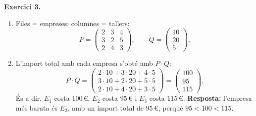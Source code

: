 \documentclass[12pt,a4paper]{article}
\newcommand{\blocInici}{%
  \par\nobreak\vspace{0pt}%
  \begin{minipage}[t]{\linewidth}%
}
\newcommand{\blocFi}{%
  \end{minipage}%
  \par
}
\begin{document}
%
\blocInici
\noindent\textbf{Exercici 3.}
\begin{enumerate}[label=\alph*),leftmargin=1.2em,itemsep=0.35em]
  \item Files = empreses; columnes = tallers:
    \[
      P =
      \begin{pmatrix}
        2 & 3 & 4 \\
        3 & 2 & 5 \\
        2 & 4 & 3
      \end{pmatrix},
      \qquad
      Q =
      \begin{pmatrix} 10 \\ 20 \\ 5 \end{pmatrix}.
    \]
  \item L'import total amb cada empresa s'obté amb $P \cdot Q$:
    \[
      P \cdot Q =
      \begin{pmatrix}
        2\cdot 10 + 3\cdot 20 + 4\cdot 5 \\
        3\cdot 10 + 2\cdot 20 + 5\cdot 5 \\
        2\cdot 10 + 4\cdot 20 + 3\cdot 5
      \end{pmatrix}
      =
      \begin{pmatrix} 100 \\ 95 \\ 115 \end{pmatrix}.
    \]
    És a dir, $E_1$ costa $100$\,\euro{}, $E_2$ costa $95$\,\euro{} i $E_3$ costa $115$\,\euro{}.
    \textbf{Resposta:} l'empresa més barata és $E_2$, amb un import total de $95$\,\euro{},
    perquè $95 < 100 < 115$.
\end{enumerate}
\blocFi

\vspace{0.7em}
\end{document}
